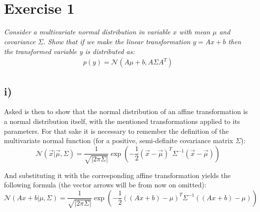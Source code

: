 \documentclass[11pt]{scrartcl} %
\begin{document}
\section*{\\[3mm]Exercise 1}
         {\it Consider a multivariate normal distribution in variable \(x\) with mean \(\mu\) and covariance \(\Sigma\). Show that if we make the linear transformation \(y=Ax+b\) then the transformed variable y is distributed as:
           \begin{align*}
             p(y) = \mathcal{N}(A\mu+b, A\Sigma A^T)
         \end{align*}}
  

         \subsection*{i)}
         Asked is then to show that the normal distribution of an affine transformation is a normal distribution itself, with the mentioned transformations applied to its parameters. For that sake it is necessary to remember the definition of the multivariate normal function (for a positive, semi-definite covariance matrix \(\Sigma\)):
         \begin{equation}\label{eq:1}
           \mathcal{N}(\vec{x} | \vec{\mu}, \Sigma) =\frac{1}{\sqrt{|2\pi\Sigma|}}
           \exp\left(-\frac{1}{2}(\vec{x}-\vec{\mu})^T{\Sigma}^{-1}(\vec{x}-\vec{\mu})\right)
         \end{equation}

         And substituting it with the corresponding affine transformation yields the following formula (the vector arrows will be from now on omitted):
        \begin{equation}\label{eq:2}
           \mathcal{N}({Ax+b} | {\mu}, \Sigma) = \frac{1}{\sqrt{|2\pi\Sigma|}} \exp\left(-\frac{1}{2}({(Ax+b)}-{\mu})^T{\Sigma}^{-1}({(Ax+b)}-{\mu})\right)
         \end{equation}


\end{document}
